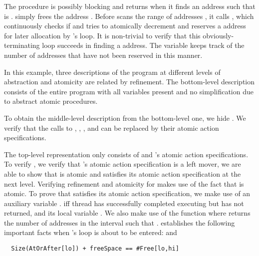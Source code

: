 The  procedure is possibly blocking and returns when it
finds an address  such that  is
.  simply frees the address
. 
Before  scans the range of addresses
\exC{[lo,hi]}, it calls , which continuously checks if
 and tries to atomically decrement 
and reserves a  address for later allocation by
's  loop. It is non-trivial to verify that this
obviously-terminating  loop succeeds in finding a
 address. The variable  keeps track of the
number of  addresses that have not been reserved in this
manner. 

In this example, three descriptions of the program at different levels
of abstraction and atomicity are related by refinement. 
The bottom-level description consists of the entire program with all
variables present and no simplification due to abstract atomic
procedures. 

To obtain the middle-level description from the bottom-level
  one, we hide . We verify that 
the calls to , ,
, and
 can be replaced by their atomic action
specifications. 

The top-level representation only
consists of  and 's atomic action
specifications. To verify , we verify that 's atomic
action specification is a left mover, we are able to show that  is
atomic and satisfies its atomic action specification at the next level. 
Verifying refinement and atomicity for  makes use
of the fact that  is atomic. To prove that 
satisfies its atomic action specification, we make use of an auxiliary
variable .  iff thread
 has successfully completed executing  but has
not returned, and its local variable . We also make use
of the function  where  returns the number
of addresses  in the interval \exC{[u,v]} such that
. 
establishes the following important facts when 's
 loop is about to be entered:  and 
\begin{verbatim}
  Size(AtOrAfter[lo]) + freeSpace == #Free[lo,hi] 
\end{verbatim}



